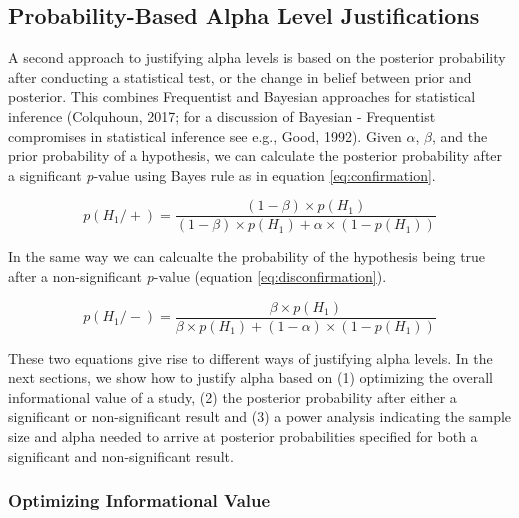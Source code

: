 \documentclass[
  english,
  ,jou,floatsintext]{apa6}
\begin{document}
\hypertarget{probability-based-alpha-level-justifications}{%
\subsection{Probability-Based Alpha Level Justifications}\label{probability-based-alpha-level-justifications}}

A second approach to justifying alpha levels is based on the posterior probability after conducting a statistical test, or the change in belief between prior and posterior. This combines Frequentist and Bayesian approaches for statistical inference (Colquhoun, 2017; for a discussion of Bayesian - Frequentist compromises in statistical inference see e.g., Good, 1992). Given \(\alpha\), \(\beta\), and the prior probability of a hypothesis, we can calculate the posterior probability after a significant \emph{p}-value using Bayes rule as in equation \ref{eq:confirmation}.

\begin{equation}
p(H_1/+) = \frac{(1-\beta) \times p(H_1)}{(1-\beta) \times p(H_1)+ \alpha \times (1-p(H_1))}
\label{eq:confirmation}
\end{equation}

In the same way we can calcualte the probability of the hypothesis being true after a non-significant \emph{p}-value (equation \ref{eq:disconfirmation}).

\begin{equation}
p(H_1/-) = \frac{\beta \times p(H_1)}{\beta \times p(H_1)+(1-\alpha) \times (1-p(H_1))}
\label{eq:disconfirmation}
\end{equation}

These two equations give rise to different ways of justifying alpha levels. In the next sections, we show how to justify alpha based on (1) optimizing the overall informational value of a study, (2) the posterior probability after either a significant or non-significant result and (3) a power analysis indicating the sample size and alpha needed to arrive at posterior probabilities specified for both a significant and non-significant result.

\hypertarget{optimizing-informational-value}{%
\subsubsection{Optimizing Informational Value}\label{optimizing-informational-value}}
\end{document}
